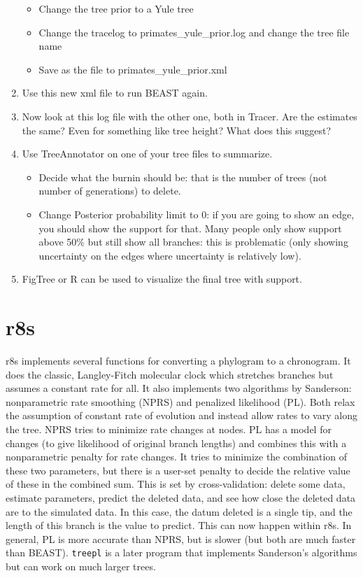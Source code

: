 \documentclass[]{book}
\providecommand{\tightlist}{%
  \setlength{\itemsep}{0pt}\setlength{\parskip}{0pt}}
\theoremstyle{definition}
\theoremstyle{definition}
\theoremstyle{remark}
\begin{document}
\begin{enumerate}
  \begin{itemize}
  \tightlist
  \item
    Change the tree prior to a Yule tree
  \item
    Change the tracelog to primates\_yule\_prior.log and change the tree
    file name
  \item
    Save as the file to primates\_yule\_prior.xml
  \end{itemize}
\item
  Use this new xml file to run BEAST again.
\item
  Now look at this log file with the other one, both in Tracer. Are the
  estimates the same? Even for something like tree height? What does
  this suggest?
\item
  Use TreeAnnotator on one of your tree files to summarize.

  \begin{itemize}
  \tightlist
  \item
    Decide what the burnin should be: that is the number of trees (not
    number of generations) to delete.
  \item
    Change Posterior probability limit to 0: if you are going to show an
    edge, you should show the support for that. Many people only show
    support above 50\% but still show all branches: this is problematic
    (only showing uncertainty on the edges where uncertainty is
    relatively low).
  \end{itemize}
\item
  FigTree or R can be used to visualize the final tree with support.
\end{enumerate}

\section{r8s}\label{r8s}

r8s implements several functions for converting a phylogram to a
chronogram. It does the classic, Langley-Fitch molecular clock which
stretches branches but assumes a constant rate for all. It also
implements two algorithms by Sanderson: nonparametric rate smoothing
(NPRS) and penalized likelihood (PL). Both relax the assumption of
constant rate of evolution and instead allow rates to vary along the
tree. NPRS tries to minimize rate changes at nodes. PL has a model for
changes (to give likelihood of original branch lengths) and combines
this with a nonparametric penalty for rate changes. It tries to minimize
the combination of these two parameters, but there is a user-set penalty
to decide the relative value of these in the combined sum. This is set
by cross-validation: delete some data, estimate parameters, predict the
deleted data, and see how close the deleted data are to the simulated
data. In this case, the datum deleted is a single tip, and the length of
this branch is the value to predict. This can now happen within r8s. In
general, PL is more accurate than NPRS, but is slower (but both are much
faster than BEAST). \texttt{treepl} is a later program that implements
Sanderson's algorithms but can work on much larger trees.
\end{document}
